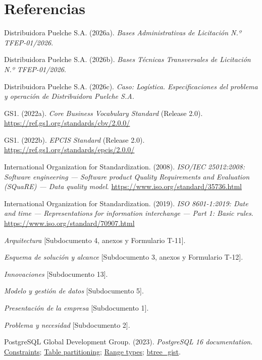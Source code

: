 \section*{Referencias}

\begin{list}{}{\setlength{\leftmargin}{1.27cm}\setlength{\itemindent}{-1.27cm}\setlength{\itemsep}{0pt}\setlength{\parsep}{0pt}}
\raggedright
\item Distribuidora Puelche S.A. (2026a). \emph{Bases Administrativas de Licitación N.º TFEP-01/2026}.
\item Distribuidora Puelche S.A. (2026b). \emph{Bases Técnicas Transversales de Licitación N.º TFEP-01/2026}.
\item Distribuidora Puelche S.A. (2026c). \emph{Caso: Logística. Especificaciones del problema y operación de Distribuidora Puelche S.A.}
\item GS1. (2022a). \emph{Core Business Vocabulary Standard} (Release 2.0). \url{https://ref.gs1.org/standards/cbv/2.0.0/}
\item GS1. (2022b). \emph{EPCIS Standard} (Release 2.0). \url{https://ref.gs1.org/standards/epcis/2.0.0/}
\item International Organization for Standardization. (2008). \emph{ISO/IEC 25012:2008: Software engineering — Software product Quality Requirements and Evaluation (SQuaRE) — Data quality model}. \url{https://www.iso.org/standard/35736.html}
\item International Organization for Standardization. (2019). \emph{ISO 8601-1:2019: Date and time — Representations for information interchange — Part 1: Basic rules}. \url{https://www.iso.org/standard/70907.html}
\item  \emph{Arquitectura} [Subdocumento 4, anexos y Formulario T-11].
\item  \emph{Esquema de solución y alcance} [Subdocumento 3, anexos y Formulario T-12].
\item  \emph{Innovaciones} [Subdocumento 13].
\item  \emph{Modelo y gestión de datos} [Subdocumento 5].
\item  \emph{Presentación de la empresa} [Subdocumento 1].
\item  \emph{Problema y necesidad} [Subdocumento 2].
\item PostgreSQL Global Development Group. (2023). \emph{PostgreSQL 16 documentation}. \href{https://www.postgresql.org/docs/16/ddl-constraints.html}{Constraints}; \href{https://www.postgresql.org/docs/16/ddl-partitioning.html}{Table partitioning}; \href{https://www.postgresql.org/docs/16/rangetypes.html}{Range types}; \href{https://www.postgresql.org/docs/16/btree-gist.html}{btree\_gist}.
\end{list}

